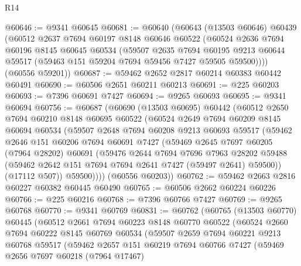 \begin{lexlean}{R14}
\begin{coremodule}
@60646 := @9341 @60645
@60681 := @60640
    (@60643
      (@13503 @60646)
      @60439
      (@60512
        @2637
        @7694
        @60197
        @8148
        @60646
        @60522
        (@60524
          @2636
          @7694
          @60196
          @8145
          @60645
          @60534
          (@59507
            @2635
            @7694
            @60195
            @9213
            @60644
            @59517
            (@59463 @151 @59204 @7694 @59456 @7427 @59505 @59500))))
      (@60556 @59201))
@60687 := @59462 @2652 @2817 @60214 @60383 @60442 @60491
@60690 := @60506 @2651 @60211 @60213
@60691 := @225 @60203
@60693 := @7396 @60691 @7427
@60694 := @9265 @60693
@60695 := @9341 @60694
@60756 := @60687
    (@60690
      (@13503 @60695)
      @60442
      (@60512
        @2650
        @7694
        @60210
        @8148
        @60695
        @60522
        (@60524
          @2649
          @7694
          @60209
          @8145
          @60694
          @60534
          (@59507
            @2648
            @7694
            @60208
            @9213
            @60693
            @59517
            (@59462
              @2646
              @151
              @60206
              @7694
              @60691
              @7427
              (@59469
                @2645
                @7697
                @60205
                (@7964 @28202)
                @60691
                (@59476
                  @2644
                  @7694
                  @7696
                  @7963
                  @28202
                  @59488
                  (@59462 @2642 @151 @7694 @7694 @2641 @7427 (@59497 @2641) @59500))
                (@17112 @507))
              @59500))))
      (@60556 @60203))
@60762 := @59462 @2663 @2816 @60227 @60382 @60445 @60490
@60765 := @60506 @2662 @60224 @60226
@60766 := @225 @60216
@60768 := @7396 @60766 @7427
@60769 := @9265 @60768
@60770 := @9341 @60769
@60831 := @60762
    (@60765
      (@13503 @60770)
      @60445
      (@60512
        @2661
        @7694
        @60223
        @8148
        @60770
        @60522
        (@60524
          @2660
          @7694
          @60222
          @8145
          @60769
          @60534
          (@59507
            @2659
            @7694
            @60221
            @9213
            @60768
            @59517
            (@59462
              @2657
              @151
              @60219
              @7694
              @60766
              @7427
              (@59469
                @2656
                @7697
                @60218
                (@7964 @17467)

\end{coremodule}
\end{lexlean}
